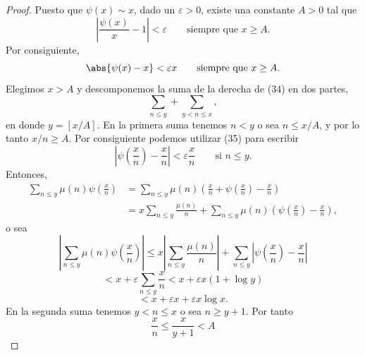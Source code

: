 \documentclass[12pt,a4paper]{book}
\begin{document}
\begin{proof}
        Puesto que $\psi(x)\sim x$, dado un $\varepsilon>0$, existe una constante
        $A>0$ tal que
        \begin{equation*}
            \left|\frac{\psi(x)}{x}-1\right|<\varepsilon\qquad\text{siempre que } x\geq A.
        \end{equation*}
        Por consiguiente,
        \begin{equation}
            \abs{\psi(x)-x}<\varepsilon x\qquad\text{siempre que } x\geq A.
        \end{equation}
        Elegimos $x>A$ y descomponemos la suma de la derecha de (34) en dos partes,
        \begin{equation*}
            \sum_{n\leq y}+\sum_{y<n\leq x},
        \end{equation*}
        en donde $y=[x/A]$. En la primera suma tenemos $n<y$ o sea $n\leq x/A$, y por
        lo tanto $x/n\geq A$. Por consiguiente podemos utilizar (35) para escribir
        \begin{equation*}
            \left|\psi\left(\frac{x}{n}\right)-\frac{x}{n}\right|<\varepsilon\frac{x}{n}\qquad
            \text{si } n\leq y.
        \end{equation*}
        Entonces,
        \begin{align*}
            \sum_{n\leq y}\mu(n)\psi\left(\frac{x}{n}\right)&=\sum_{n\leq y}\mu(n)
            \left(\frac{x}{n}+\psi\left(\frac{x}{n}\right)-\frac{x}{n}\right)\\
            &=x\sum_{n\leq y}\frac{\mu(n)}{n}+\sum_{n\leq y}\mu(n)\left(\psi\left(\frac{x}{n}\right)-\frac{x}{n}\right),
        \end{align*}
        o sea
        \begin{equation*}
            \left|\sum_{n\leq y}\mu(n)\psi\left(\frac{x}{n}\right)\right|
            \leq x\left|\sum_{n\leq y}\frac{\mu(n)}{n}\right|+\sum_{n\leq y}\left|\psi\left(\frac{x}{n}\right)-\frac{x}{n}\right|
        \end{equation*}
        \begin{equation*}
            <x+\varepsilon\sum_{n\leq y}\frac{x}{n}<x+\varepsilon x(1+\log y)
        \end{equation*}
        \begin{equation*}
            <x+\varepsilon x+\varepsilon x\log x.
        \end{equation*}
        En la segunda suma tenemos $y<n\leq x$ o sea $n\geq y+1$. Por tanto
        \begin{equation*}
            \frac{x}{n}\leq\frac{x}{y+1}<A

\end{equation*}
\end{proof}
\end{document}
